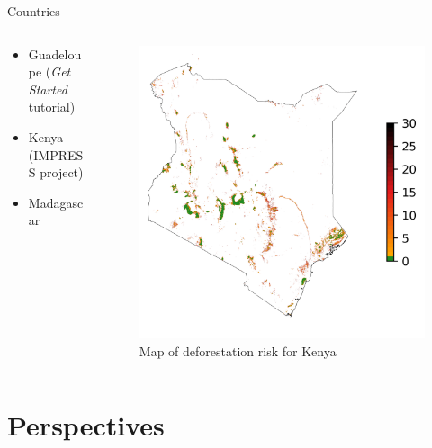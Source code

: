 \documentclass[10pt,table,dvipsnames,compress]{beamer}
\begin{document}
\begin{frame}[label={sec:org969b8de}]{Countries}
\begin{columns}
\begin{column}{0.5\columnwidth}
\begin{itemize}
\item Guadeloupe (\emph{Get Started} tutorial)
\item Kenya (IMPRESS project)
\item Madagascar
\end{itemize}
\end{column}

\begin{column}{0.5\columnwidth}
\begin{figure}[htbp]
\centering
\includegraphics[width=\textwidth]{figs/riskmap_kenya.png}
\caption{\label{fig:orgf55086c}Map of deforestation risk for Kenya}
\end{figure}
\end{column}
\end{columns}
\end{frame}


\section{Perspectives}
\label{sec:org50d43e1}
\end{document}

